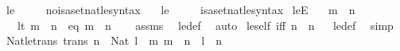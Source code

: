 \begin{isabellebody}
\ le\ {\isacharparenleft}{\kern0pt}\ {\isachardoublequoteopen}{\isasymle}{\isachardoublequoteclose}\ {}{}{\isacharparenright}{\kern0pt}\ \isamarkupfalse%
\isanewline
{}\isamarkupfalse%
\ no{\isacharunderscore}{\kern0pt}isa{\isacharunderscore}{\kern0pt}set{\isacharunderscore}{\kern0pt}nat{\isacharunderscore}{\kern0pt}le{\isacharunderscore}{\kern0pt}syntax\ \ \isamarkupfalse%
\ le\ {\isacharparenleft}{\kern0pt}\ {\isachardoublequoteopen}{\isasymle}{\isachardoublequoteclose}\ {}{}{\isacharparenright}{\kern0pt}\ \isamarkupfalse%
\isanewline
{}\isamarkupfalse%
\ isa{\isacharunderscore}{\kern0pt}set{\isacharunderscore}{\kern0pt}nat{\isacharunderscore}{\kern0pt}le{\isacharunderscore}{\kern0pt}syntax\isanewline
\isanewline
{}\isamarkupfalse%
\ leE{\isacharcolon}{\kern0pt}\isanewline
\ \ \ {\isachardoublequoteopen}m\ {\isasymle}\ n{\isachardoublequoteclose}\isanewline
\ \ \ {\isacharparenleft}{\kern0pt}lt{\isacharparenright}{\kern0pt}\ {\isachardoublequoteopen}m\ {\isacharless}{\kern0pt}\ n{\isachardoublequoteclose}\ {\isacharbar}{\kern0pt}\ {\isacharparenleft}{\kern0pt}eq{\isacharparenright}{\kern0pt}\ {\isachardoublequoteopen}m\ {\isacharequal}{\kern0pt}\ n{\isachardoublequoteclose}\isanewline
%
\isadelimproof
\ \ %
\endisadelimproof
%
\isatagproof
{}\isamarkupfalse%
\ assms\ \isamarkupfalse%
\ le{\isacharunderscore}{\kern0pt}def\ \isamarkupfalse%
\ auto%
\endisatagproof
{\isafoldproof}%
%
\isadelimproof
\isanewline
%
\endisadelimproof
\isanewline
{}\isamarkupfalse%
\ le{\isacharunderscore}{\kern0pt}self\ {\isacharbrackleft}{\kern0pt}iff{\isacharbrackright}{\kern0pt}{\isacharcolon}{\kern0pt}\ {\isachardoublequoteopen}n\ {\isasymle}\ n{\isachardoublequoteclose}%
\isadelimproof
\ %
\endisadelimproof
%
\isatagproof
{}\isamarkupfalse%
\ le{\isacharunderscore}{\kern0pt}def\ \isamarkupfalse%
\ simp%
\endisatagproof
{\isafoldproof}%
%
\isadelimproof
%
\endisadelimproof
\isanewline
\isanewline
{}\isamarkupfalse%
\ Nat{\isacharunderscore}{\kern0pt}le{\isacharunderscore}{\kern0pt}trans\ {\isacharbrackleft}{\kern0pt}trans{\isacharbrackright}{\kern0pt}{\isacharcolon}{\kern0pt}\ {\isachardoublequoteopen}{\isasymlbrakk}n\ {\isacharcolon}{\kern0pt}\ Nat{\isacharsemicolon}{\kern0pt}\ l\ {\isasymle}\ m{\isacharsemicolon}{\kern0pt}\ m\ {\isasymle}\ n{\isasymrbrakk}\ {\isasymLongrightarrow}\ l\ {\isasymle}\ n{\isachardoublequoteclose}\isanewline

\end{isabellebody}
